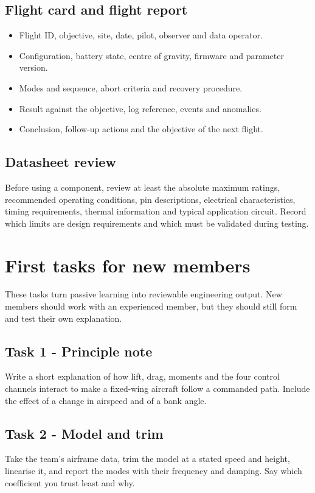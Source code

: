\documentclass[11pt,a4paper]{article}
\begin{document}
\subsection{Flight card and flight report}
\begin{itemize}
  \item Flight ID, objective, site, date, pilot, observer and data operator.
  \item Configuration, battery state, centre of gravity, firmware and parameter version.
  \item Modes and sequence, abort criteria and recovery procedure.
  \item Result against the objective, log reference, events and anomalies.
  \item Conclusion, follow-up actions and the objective of the next flight.
\end{itemize}

\subsection{Datasheet review}

Before using a component, review at least the absolute maximum ratings,
recommended operating conditions, pin descriptions, electrical
characteristics, timing requirements, thermal information and typical
application circuit. Record which limits are design requirements and which must
be validated during testing.

\section{First tasks for new members}

These tasks turn passive learning into reviewable engineering output. New
members should work with an experienced member, but they should still form and
test their own explanation.

\subsection{Task 1 - Principle note}
Write a short explanation of how lift, drag, moments and the four control
channels interact to make a fixed-wing aircraft follow a commanded path.
Include the effect of a change in airspeed and of a bank angle.

\subsection{Task 2 - Model and trim}
Take the team's airframe data, trim the model at a stated speed and height,
linearise it, and report the modes with their frequency and damping. Say which
coefficient you trust least and why.
\end{document}
